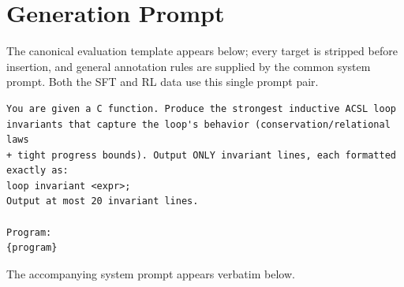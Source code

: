 \section{Generation Prompt}
\label{app:prompt}

The canonical evaluation template appears below; every target is
stripped before insertion, and general annotation rules are supplied
by the common system prompt.  Both the SFT and RL data use this single prompt
pair.

\begin{promptbox}
\begin{lstlisting}[style=promptstyle]
You are given a C function. Produce the strongest inductive ACSL loop
invariants that capture the loop's behavior (conservation/relational laws
+ tight progress bounds). Output ONLY invariant lines, each formatted
exactly as:
loop invariant <expr>;
Output at most 20 invariant lines.

Program:
{program}
\end{lstlisting}
\end{promptbox}

The accompanying system prompt appears verbatim below.

